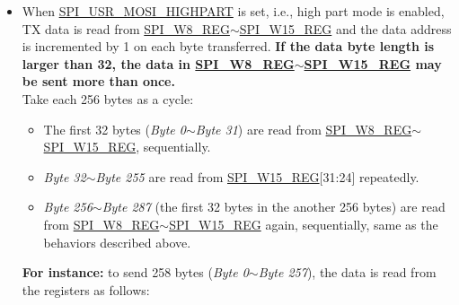 \documentclass[main\_\_EN.tex]{subfiles}
\begin{document}
\begin{itemize}
\begin{itemize}
\begin{itemize}
            \item \emph{Byte 64}$\sim$\emph{Byte 255} are read from \hyperref[regdesc:SPIW15REG]{SPI\_W15\_REG}[31:24] repeatedly.
            \item The other bytes (\emph{Byte 256} and \emph{Byte 257}) are read from \hyperref[regdesc:SPIW0REG]{SPI\_W0\_REG}[7:0] and \hyperref[regdesc:SPIW0REG]{SPI\_W0\_REG}[15:8] again, sequentially. The logic is:
            \begin{itemize}
                \item The address to read data for \emph{Byte 256} is the result of (256 \% 64 = 0), i.e., \hyperref[regdesc:SPIW0REG]{SPI\_W0\_REG}[7:0].
                \item The address to read data for \emph{Byte 257} is the result of (257 \% 64 = 1), i.e., \hyperref[regdesc:SPIW0REG]{SPI\_W0\_REG}[15:8].
            \end{itemize}
        \end{itemize}       
        \item When \hyperref[fielddesc:SPIUSRMOSIHIGHPART]{SPI\_USR\_MOSI\_HIGHPART} is set, i.e., high part mode is enabled, TX data is read from \hyperref[regdesc:SPIW8REG]{SPI\_W8\_REG}$\sim$\hyperref[regdesc:SPIW15REG]{SPI\_W15\_REG} and the data address is incremented by 1 on each byte transferred. \textbf{If the data byte length is larger than 32, the data in \hyperref[regdesc:SPIW8REG]{SPI\_W8\_REG}$\sim$\hyperref[regdesc:SPIW15REG]{SPI\_W15\_REG} may be sent more than once.} \\
        Take each 256 bytes as a cycle:
        \begin{itemize}
            \item The first 32 bytes (\emph{Byte 0}$\sim$\emph{Byte 31}) are read from \hyperref[regdesc:SPIW8REG]{SPI\_W8\_REG}$\sim$\hyperref[regdesc:SPIW15REG]{SPI\_W15\_REG}, sequentially.
            \item \emph{Byte 32}$\sim$\emph{Byte 255} are read from \hyperref[regdesc:SPIW15REG]{SPI\_W15\_REG}[31:24] repeatedly.
            \item \emph{Byte 256}$\sim$\emph{Byte 287} (the first 32 bytes in the another 256 bytes) are read from \hyperref[regdesc:SPIW8REG]{SPI\_W8\_REG}$\sim$\hyperref[regdesc:SPIW15REG]{SPI\_W15\_REG} again, sequentially, same as the behaviors described above.
        \end{itemize}
        \textbf{For instance:} to send 258 bytes (\emph{Byte 0}$\sim$\emph{Byte 257}), the data is read from the registers as follows:

\end{itemize}
\end{itemize}
\end{document}
